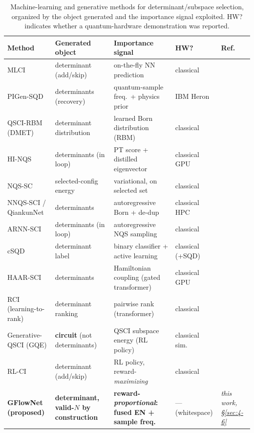 \documentclass[11pt]{article}
\begin{document}
\begin{table}[t]\centering\footnotesize
\caption{Machine-learning and generative methods for determinant/subspace selection, organized by the object generated and the importance signal exploited. HW? indicates whether a quantum-hardware demonstration was reported.}
\label{tab:ml}
\renewcommand{\arraystretch}{1.25}
\begin{tabularx}{\textwidth}{@{}>{\raggedright\arraybackslash}p{2.0cm} >{\raggedright\arraybackslash}p{2.5cm} >{\raggedright\arraybackslash}X >{\raggedright\arraybackslash}p{1.55cm} >{\raggedright\arraybackslash}p{2.5cm}@{}}
\toprule
\textbf{Method} & \textbf{Generated object} & \textbf{Importance signal} & \textbf{HW?} & \textbf{Ref.} \\
\midrule
MLCI & determinant (add/skip) & on-the-fly NN prediction & classical & \cite{coe2018} \\
PIGen-SQD & determinants (recovery) & quantum-sample freq.\ + physics prior & IBM Heron & \cite{patra2025} \\
QSCI-RBM (DMET) & determinant distribution & learned Born distribution (RBM) & classical & \cite{patra2026} \\
HI-NQS & determinants (in loop) & PT score + distilled eigenvector & classical GPU & \cite{chang2026} \\
NQS-SC & selected-config energy & variational, on selected set & classical & \cite{solanki2026} \\
NNQS-SCI / QiankunNet & determinants & autoregressive Born + de-dup & classical HPC & \cite{shang2025,sun2026} \\
ARNN-SCI & determinants (in loop) & autoregressive NQS sampling & classical & \cite{thompson2026} \\
cSQD & determinant label & binary classifier + active learning & classical (+SQD) & \cite{zeni2026} \\
HAAR-SCI & determinants & Hamiltonian coupling (gated transformer) & classical GPU & \cite{zhanghaar2025} \\
RCI (learning-to-rank) & determinant ranking & pairwise rank (transformer) & classical & \cite{nie2026} \\
Generative-QSCI (GQE) & \textbf{circuit} (not determinants) & QSCI subspace energy (RL policy) & classical sim.\ & \cite{kemmoku2026} \\
RL-CI & determinant (add/skip) & RL policy, reward-\emph{maximizing} & classical & \cite{goings2021} \\
\textbf{GFlowNet (proposed)} & \textbf{determinant, valid-$N$ by construction} & \textbf{reward-\emph{proportional}: fused EN + sample freq.} & --- (whitespace) & \emph{this work, \S\ref{sec:4-6}} \\
\bottomrule
\end{tabularx}
\end{table}
\end{document}
